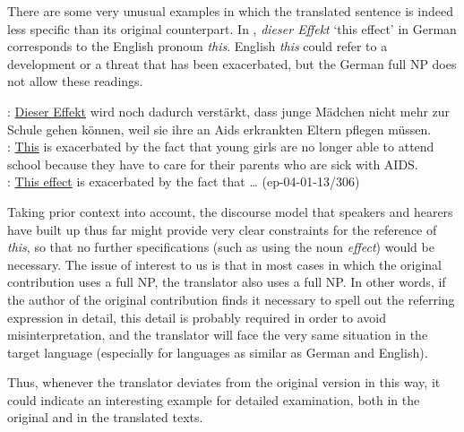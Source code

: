\documentclass[output=paper]{LSP/langsci}
\begin{document}
There are some very unusual examples in which the translated sentence is indeed less specific than its original counterpart. In , \textit{dieser Effekt} `this effect' in German corresponds to the English pronoun \textit{this}. English \textit{this} could refer to a development or a threat that has been exacerbated, but the German full NP does not allow these readings. %

\ea	\label{ex:pron_this} %
\DEo : \ul{Dieser Effekt} wird noch dadurch verst\"arkt, dass junge M\"adchen nicht mehr zur Schule gehen k\"onnen, weil sie ihre an Aids erkrankten Eltern pflegen m\"ussen.\\
\ENt : \ul{This} is exacerbated by the fact that young girls are no longer able to attend school because they have to care for their parents who are sick with AIDS. \\
\DElit: \ul{This effect} is exacerbated by the fact that \dots 
\hfill{(ep-04-01-13/306)}
\z

Taking prior context into account, the discourse model that speakers and hearers have built up thus far might provide very clear constraints for the reference of \textit{this}, so that no further specifications (such as using the noun \textit{effect}) would be necessary.  The issue of interest to us is that in most cases in which the original contribution uses a full NP, the translator also uses a full NP. In other words, if the author of the original contribution finds it necessary to spell out the referring expression in detail, this detail is probably required in order  to avoid misinterpretation, and the translator will face the very same situation in the target language (especially for languages as similar as German and English).

Thus, whenever the translator deviates from the original version in this way, it could indicate an interesting example for detailed examination, both in the original and in the translated texts.


\end{document}

